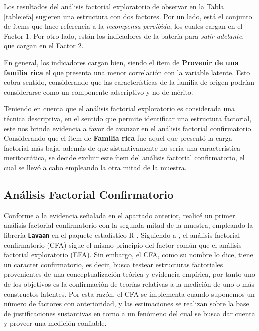 \documentclass[12pt]{article}
\renewcommand{\baselinestretch}{1.5} %
\begin{document}
\renewcommand{\arraystretch}{0.75}
\renewcommand{\baselinestretch}{1.5}


Los resultados del análisis factorial exploratorio de observar en la Tabla \ref{table:efa} sugieren una estructura con dos factores. Por un lado, está el conjunto de ítems que hace referencia a la \textit{recompensa percibida}, los cuales cargan en el Factor 1. Por otro lado, están los indicadores de la batería para \textit{salir adelante}, que cargan en el Factor 2. 

En general, los indicadores cargan bien, siendo el ítem de \textbf{Provenir de una familia rica} el que presenta una menor correlación con la variable latente. Esto cobra sentido, considerando que las características de la familia de origen podrían considerarse como un componente adscriptivo y no de mérito.      

\renewcommand{\baselinestretch}{1.15}


Teniendo en cuenta que el análisis factorial exploratorio es considerada una técnica descriptiva, en el sentido que permite identificar una estructura factorial, este nos brinda evidencia a favor de avanzar en el análisis factorial confirmatorio. Considerando que el ítem de \textbf{Familia rica} fue aquel que presentó la carga factorial más baja, además de que sistantivamente no sería una característica meritocrática, se decide excluir este ítem del análisis factorial confirmatorio, el cual se llevó a cabo empleando la otra mitad de la muestra. 

\subsection*{Análisis Factorial Confirmatorio}

Conforme a la evidencia señalada en el apartado anterior, realicé un primer análisis factorial confirmatorio con la segunda mitad de la muestra, empleando la librería \textbf{\texttt{Lavaan}} \citep{Rosseel2012} en el paquete estadístico R . Siguiendo a \citet{Brown2008}, el análisis factorial confirmatorio (CFA) sigue el mismo principio del factor común que el análisis factorial exploratorio (EFA). Sin embargo, el CFA, como su nombre lo dice, tiene un caracter confirmatorio, es decir, busca testear estructuras factoriales provenientes de una conceptualización teórica y evidencia empírica, por tanto uno de los objetivos es la confirmación de teorías relativas a la medición de uno o más constructos latentes. Por esta razón, el CFA se implementa cuando suponemos un número de factores con anterioridad, y las estimaciones se realizan sobre la base de justificaciones sustantivas en torno a un fenómeno del cual se busca dar cuenta y proveer una medición confiable. 
\end{document}
